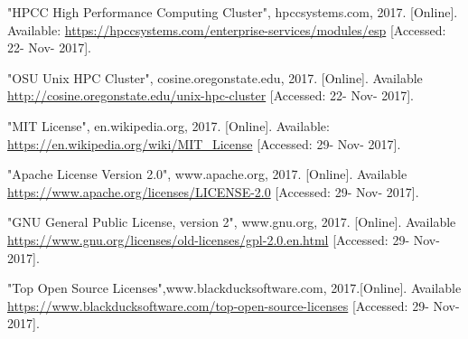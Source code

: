 \documentclass[onecolumn, draftclsnofoot,10pt, compsoc]{IEEEtran}
\begin{document}
\begin{thebibliography}{9}
 "HPCC High Performance Computing Cluster", hpccsystems.com, 2017. [Online]. Available: \url{https://hpccsystems.com/enterprise-services/modules/esp} [Accessed: 22- Nov- 2017].

 "OSU Unix HPC Cluster", cosine.oregonstate.edu, 2017. [Online]. Available \url{http://cosine.oregonstate.edu/unix-hpc-cluster} [Accessed: 22- Nov- 2017].

 "MIT License", en.wikipedia.org, 2017. [Online]. Available: \url{https://en.wikipedia.org/wiki/MIT_License} [Accessed: 29- Nov- 2017].

 "Apache License Version 2.0", www.apache.org, 2017. [Online]. Available \url{https://www.apache.org/licenses/LICENSE-2.0} [Accessed: 29- Nov- 2017].

 "GNU General Public License, version 2", www.gnu.org, 2017. [Online]. Available \url{https://www.gnu.org/licenses/old-licenses/gpl-2.0.en.html} [Accessed: 29- Nov- 2017].

 "Top Open Source Licenses",www.blackducksoftware.com, 2017.[Online]. Available \url{https://www.blackducksoftware.com/top-open-source-licenses} [Accessed: 29- Nov- 2017].
\end{thebibliography}
\end{document}
